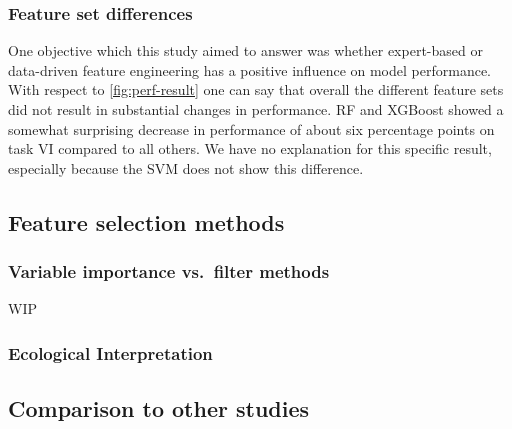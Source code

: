 \documentclass[letterpaper, peerreview]{IEEEtran}
\begin{document}

\subsubsection{Feature set differences}
One objective which this study aimed to answer was whether expert-based or data-driven feature engineering has a positive influence on model performance.
With respect to \autoref{fig:perf-result} one can say that overall the different feature sets did not result in substantial changes in performance.
RF and XGBoost showed a somewhat surprising decrease in performance of about six percentage points on task VI compared to all others.
We have no explanation for this specific result, especially because the SVM does not show this difference.

\subsection{Feature selection methods}


\subsubsection{Variable importance vs.\ filter methods}

WIP

\subsubsection{Ecological Interpretation}


\subsection{Comparison to other studies}
\end{document}
